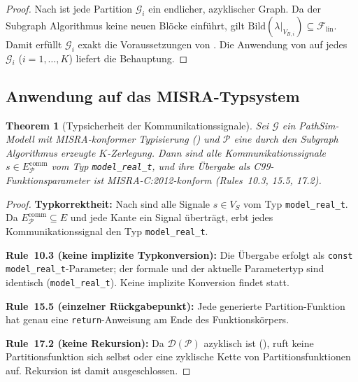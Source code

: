 ﻿\documentclass[12pt,a4paper]{article}
\newtheorem{theorem}{Theorem}[section]
\theoremstyle{definition}
\begin{document}
\begin{proof}
Nach  ist jede Partition $\mathcal{G}_i$ ein endlicher,
azyklischer Graph. Da der Subgraph Algorithmus keine neuen Blöcke einführt,
gilt $\mathrm{Bild}(\lambda|_{V_{B,i}}) \subseteq \mathcal{F}_{\mathrm{lin}}$.
Damit erfüllt $\mathcal{G}_i$ exakt die Voraussetzungen von .
Die Anwendung von  auf jedes $\mathcal{G}_i$
($i = 1, \ldots, K$) liefert die Behauptung.
\end{proof}

\subsection{Anwendung auf das MISRA-Typsystem}
\label{subsec:subgraph-misra}

\begin{theorem}[Typsicherheit der Kommunikationssignale]
\label{thm:subgraph-type}
Sei $\mathcal{G}$ ein PathSim-Modell mit MISRA-konformer Typisierung
() und $\mathcal{P}$ eine durch den Subgraph Algorithmus
erzeugte $K$-Zerlegung. Dann sind alle Kommunikationssignale
$s \in E_{\mathcal{P}}^{\mathrm{comm}}$ vom Typ
\texttt{model\_real\_t}, und ihre Übergabe als C99-Funktionsparameter ist
MISRA-C:2012-konform (Rules~10.3, 15.5, 17.2).
\end{theorem}

\begin{proof}
\textbf{Typkorrektheit:}
Nach  sind alle Signale $s \in V_S$ vom Typ
\texttt{model\_real\newline \_t}. Da $E_{\mathcal{P}}^{\mathrm{comm}} \subseteq E$
und jede Kante ein Signal überträgt, erbt jedes Kommunikationssignal
den Typ \texttt{model\_real\_t}.

\textbf{Rule~10.3 (keine implizite Typkonversion):}
Die Übergabe erfolgt als \texttt{const model\_real\_t}-Parameter; der
formale und der aktuelle Parametertyp sind identisch (\texttt{model\_real\_t}).
Keine implizite Konversion findet statt.

\textbf{Rule~15.5 (einzelner Rückgabepunkt):}
Jede generierte Partition-Funktion hat genau eine \texttt{return}-Anweisung
am Ende des Funktionskörpers.

\textbf{Rule~17.2 (keine Rekursion):}
Da $\mathcal{D}(\mathcal{P})$ azyklisch ist (),
ruft keine Partitionsfunktion sich selbst oder eine zyklische Kette
von Partitionsfunktionen auf. Rekursion ist damit ausgeschlossen.
\end{proof}
\end{document}
